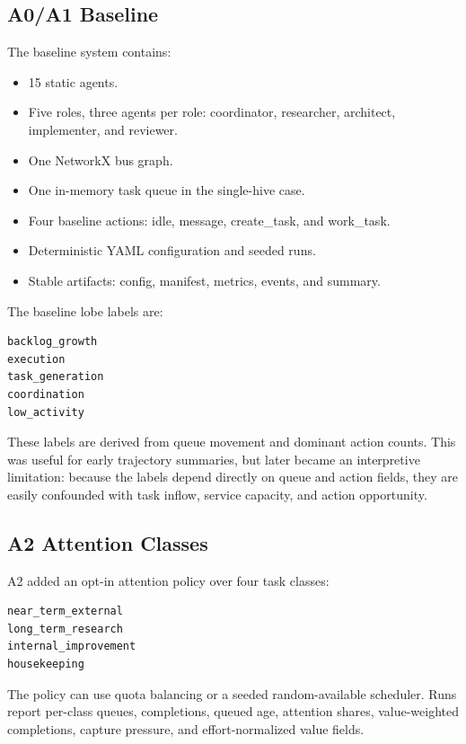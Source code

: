 \documentclass[11pt]{article}
\begin{document}
\subsection{A0/A1 Baseline}

The baseline system contains:

\begin{itemize}
\item 15 static agents.
\item Five roles, three agents per role: coordinator, researcher, architect,
implementer, and reviewer.
\item One NetworkX bus graph.
\item One in-memory task queue in the single-hive case.
\item Four baseline actions: idle, message, create\_task, and work\_task.
\item Deterministic YAML configuration and seeded runs.
\item Stable artifacts: config, manifest, metrics, events, and summary.
\end{itemize}

The baseline lobe labels are:

\begin{verbatim}
backlog_growth
execution
task_generation
coordination
low_activity
\end{verbatim}

These labels are derived from queue movement and dominant action counts. This
was useful for early trajectory summaries, but later became an interpretive
limitation: because the labels depend directly on queue and action fields, they
are easily confounded with task inflow, service capacity, and action
opportunity.

\subsection{A2 Attention Classes}

A2 added an opt-in attention policy over four task classes:

\begin{verbatim}
near_term_external
long_term_research
internal_improvement
housekeeping
\end{verbatim}

The policy can use quota balancing or a seeded random-available scheduler. Runs
report per-class queues, completions, queued age, attention shares,
value-weighted completions, capture pressure, and effort-normalized value
fields.
\end{document}
